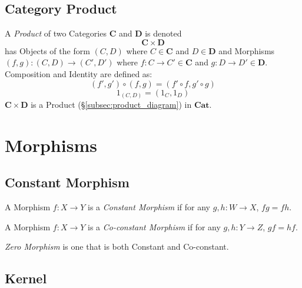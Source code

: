 \subsection{Category Product}\label{subsec:category_product}

A \emph{Product} of two Categories $\mathbf{C}$ and $\mathbf{D}$ is
denoted
\[
    \mathbf{C} \times \mathbf{D}
\]
has Objects of the form $(C,D)$ where $C \in \mathbf{C}$ and $D \in
\mathbf{D}$ and Morphisms $(f,g) : (C,D) \rightarrow (C',D')$ where $f
: C \rightarrow C' \in \mathbf{C}$ and $g : D \rightarrow D' \in
\mathbf{D}$. Composition and Identity are defined as:
\[
    (f',g') \circ (f,g) = (f' \circ f,g' \circ g)
\]\[
    1_{(C,D)} = (1_C, 1_D)
\]
$\mathbf{C} \times \mathbf{D}$ is a Product
(\S\ref{subsec:product_diagram}) in $\mathbf{Cat}$.

\section{Morphisms}\label{sec:category_morphisms}



\subsection{Constant Morphism}\label{subsec:constant_morphism}

A Morphism $f : X \rightarrow Y$ is a \emph{Constant Morphism} if for
any $g, h : W \rightarrow X$, $fg = fh$.

A Morphism $f : X \rightarrow Y$ is a \emph{Co-constant Morphism} if
for any $g, h : Y \rightarrow Z$, $gf = hf$.

\emph{Zero Morphism} is one that is both Constant and Co-constant.

\subsection{Kernel}\label{subsec:morphism_kernel}

